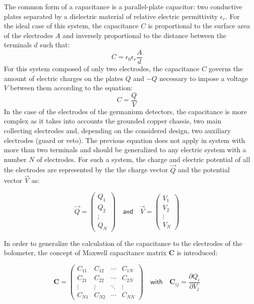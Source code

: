 The common form of a capacitance is a parallel-plate capacitor: two conductive plates separated by a dielectric material of relative electric permittivity $\epsilon_r$. For the ideal case of this system, the capacitance $C$ is proportional to the surface area of the electrodes $A$ and inversely proportional to the distance between the terminals $d$ such that:
\begin{equation}
C = \epsilon_0 \epsilon_r \frac{A}{d}
\end{equation}
For this system composed of only two electrodes, the capacitance $C$ governs the amount of electric charges on the plates $Q$ and $-Q$ necessary to impose a voltage $V$ between them according to the equation:
 \begin{equation}
 \label{eq:capacitance-definition-simple}
C = \frac{Q}{V}
\end{equation}
In the case of the electrodes of the germanium detectors, the capacitance is more complex as it takes into accounts the grounded copper chassis, two main collecting electrodes and, depending on the considered design, two auxiliary electrodes (guard or veto). The previous equation does not apply in system with more than two terminals and should be generalized to any electric system with a number $N$ of electrodes. For such a system, the charge and electric potential of all the electrodes are represented by the the charge vector $\vec{Q}$ and the potential vector $\vec{V}$ as:

\begin{equation} 
\label{eq:vector-charge-potential}
\vec{Q} = 
\begin{pmatrix}
Q_{1} \\ 
Q_{2} \\ 
\vdots \\ 
Q_{N}
\end{pmatrix} 
\quad \textsf{and} \quad
\vec{V} = 
\begin{pmatrix}
V_{1} \\ 
V_{2} \\ 
\vdots \\
V_{N}
\end{pmatrix} 
\end{equation}

In order to generalize the calculation of the capacitance to the electrodes of the bolometer, the concept of Maxwell capacitance matrix $\bm{C}$ is introduced:

\begin{equation} 
\label{eq:maxwell-capacitance-matrix}
\bm{C} = 
\begin{pmatrix}
C_{11} & C_{12} & \cdots & C_{1N} \\ 
C_{21} & C_{22} & \cdots & C_{2N} \\ 
\vdots & \vdots & \ddots & \vdots \\ 
C_{N1} & C_{N2} & \cdots & C_{NN}
\end{pmatrix}
\quad \textsf{with} \quad
\bm{C}_{ij} = \frac{\partial Q_i}{\partial V_j}
\end{equation}

